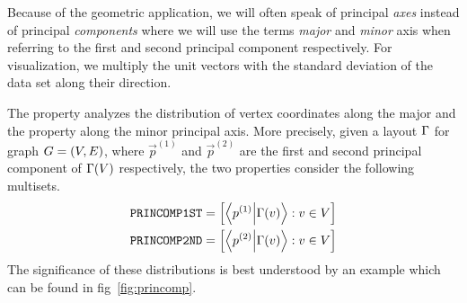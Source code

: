 \documentclass{graphstudy}
\begin{document}
Because of the geometric application, we will often speak of principal \emph{axes} instead of principal
\emph{components} where we will use the terms \emph{major} and \emph{minor} axis when referring to the first and second
principal component respectively.  For visualization, we multiply the unit vectors with the standard deviation of the
data set along their direction.

The  property analyzes the distribution of vertex coordinates along the major and the
 property along the minor principal axis.  More precisely, given a layout \(\Gamma\) for graph
\(G=(V,E)\), where \(\vec{p}^{(1)}\) and \(\vec{p}^{(2)}\) are the first and second principal component of
\(\Gamma(V)\) respectively, the two properties consider the following multisets.
\begin{align}
  &\menum{PRINCOMP1ST} = \multiset{\braket{\vec{p}^{(1)}}{\Layout(v)}\suchthat{v}\in\GraphV}\\
  &\menum{PRINCOMP2ND} = \multiset{\braket{\vec{p}^{(2)}}{\Layout(v)}\suchthat{v}\in\GraphV}
\end{align}
The significance of these distributions is best understood by an example which can be found in
\acl{fig}~\ref{fig:princomp}.
\end{document}
